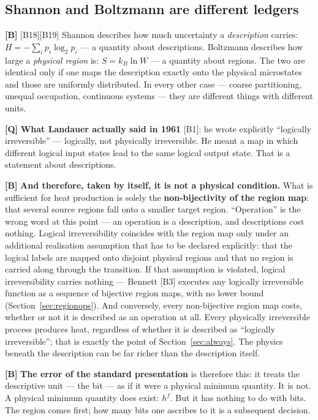 \subsection{Shannon and Boltzmann are different ledgers}

\textbf{[B]} [B18][B19] Shannon describes how much uncertainty a \emph{description}
carries: $H = -\sum_i p_i \log_2 p_i$ --- a quantity about descriptions. Boltzmann
describes how large a \emph{physical region} is: $S = k_B \ln W$ --- a quantity
about regions. The two are identical only if one maps the description exactly onto
the physical microstates and those are uniformly distributed. In every other case
--- coarse partitioning, unequal occupation, continuous systems --- they are
different things with different units.

\textbf{[Q]} \textbf{What Landauer actually said in 1961} [B1]: he wrote explicitly
“logically irreversible” --- logically, not physically irreversible. He meant a
map in which different logical input states lead to the same logical output state.
That is a statement about descriptions.

\textbf{[B]} \textbf{And therefore, taken by itself, it is not a physical condition.} What
is sufficient for heat production is solely the \textbf{non-bijectivity of the
region map}: that several source regions fall onto a smaller target region.
“Operation” is the wrong word at this point --- an operation is a description, and
descriptions cost nothing. Logical irreversibility coincides with the region map
only under an additional realisation assumption that has to be declared
explicitly: that the logical labels are mapped onto disjoint physical regions and
that no region is carried along through the transition. If that assumption is
violated, logical irreversibility carries nothing --- Bennett [B3] executes any
logically irreversible function as a sequence of bijective region maps, with no
lower bound (Section~\ref{sec:regionops}). And conversely, every non-bijective
region map costs, whether or not it is described as an operation at all. Every
physically irreversible process produces heat, regardless of whether it is
described as “logically irreversible”; that is exactly the point of
Section~\ref{sec:always}. The physics beneath the description can be far richer
than the description itself.

\textbf{[B]} \textbf{The error of the standard presentation} is therefore this: it treats
the descriptive unit --- the bit --- as if it were a physical minimum quantity. It
is not. A physical minimum quantity does exist: $h^f$. But it has nothing to do
with bits. The region comes first; how many bits one ascribes to it is a
subsequent decision.

